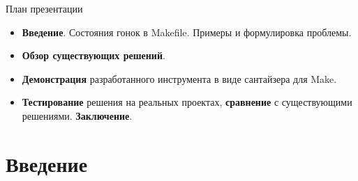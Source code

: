     \begin{frame}{План презентации}
        \begin{itemize}
            \setlength\itemsep{1.1em}
            \item \textbf{Введение}. Состояния гонок в Makefile. Примеры и формулировка проблемы.
            \item \textbf{Обзор существующих решений}.
            \item \textbf{Демонстрация} разработанного инструмента в виде сантайзера для Make.
            \item \textbf{Тестирование} решения на реальных проектах, \textbf{сравнение} с существующими решениями. \textbf{Заключение}.
        \end{itemize}

    \end{frame}


    \section{Введение}

%
%
%
%

